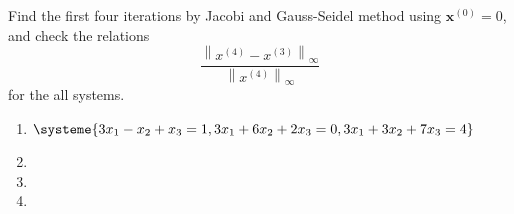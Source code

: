 \documentclass[../main-sheet.tex]{subfiles}
\begin{document}
    \begin{prob}[H.W.]
        Find the first four iterations by Jacobi and Gauss-Seidel method using \(\mathbf{x}^{(0)}=0\), and check the relations 
        \[
            \frac{\left\| x^{(4)}-x^{(3)} \right\|_{\infty}}{\left\| x^{(4)}\right\|_{\infty}}
        \]
        for the all systems.
        \begin{enumerate}
            \item \(\systeme{
                3x_1-x_2+x_3=1,
                3x_1+6x_2+2x_3=0,
                3x_1+3x_2+7x_3=4
            }\)
            \item {}
            \item {}
            \item {}
        \end{enumerate}
    \end{prob}
\end{document}
